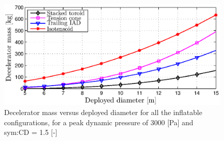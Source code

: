 

\begin{figure}[H]
\includegraphics[width = 1.0\textwidth]{Figure/mass_dia.eps}
\caption{Decelerator mass versus deployed diameter for all the inflatable configurations, for a peak dynamic pressure of 3000 [Pa] and \gls{sym:CD} = 1.5 [-]}
\label{fig:mass_dia}
\end{figure}
